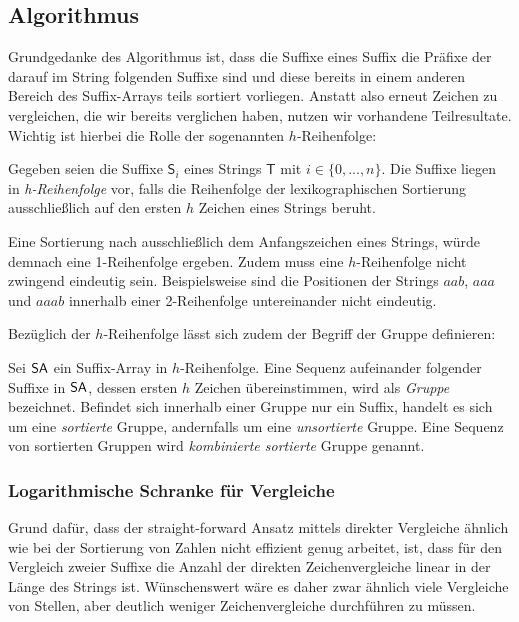 \subsection{Algorithmus}
\label{qsufsort:algo}
Grundgedanke des Algorithmus ist, dass die Suffixe eines Suffix die Präfixe der darauf im String folgenden Suffixe sind und diese bereits in einem anderen Bereich des Suffix-Arrays teils sortiert vorliegen. Anstatt also erneut Zeichen zu vergleichen, die wir bereits verglichen haben, nutzen wir vorhandene Teilresultate.
Wichtig ist hierbei die Rolle der sogenannten $h$-Reihenfolge:
\begin{definition}[$h$-Reihenfolge]
Gegeben seien die Suffixe $\mathsf{S}_i$ eines Strings $\mathsf{T}$ mit $i \in \{0,...,n\}$. Die Suffixe liegen in \textit{h-Reihenfolge} vor, falls die Reihenfolge der lexikographischen Sortierung ausschließlich auf den ersten $h$ Zeichen eines Strings beruht. 
\end{definition}
Eine Sortierung nach ausschließlich dem Anfangszeichen eines Strings, würde demnach eine 1-Reihenfolge ergeben. Zudem muss eine $h$-Reihenfolge nicht zwingend eindeutig sein. Beispielsweise sind die Positionen der Strings $aab$, $aaa$ und $aaab$ innerhalb einer 2-Reihenfolge untereinander nicht eindeutig. 

Bezüglich der $h$-Reihenfolge lässt sich zudem der Begriff der Gruppe definieren:
\begin{definition}[Gruppe]
Sei $\sa$ ein Suffix-Array in $h$-Reihenfolge. Eine Sequenz aufeinander folgender Suffixe in $\sa$, dessen ersten $h$ Zeichen übereinstimmen, wird als \textit{Gruppe} bezeichnet. Befindet sich innerhalb einer Gruppe nur ein Suffix, handelt es sich um eine \textit{sortierte} Gruppe, andernfalls um eine \textit{unsortierte} Gruppe. 
Eine Sequenz von sortierten Gruppen wird \textit{kombinierte sortierte} Gruppe genannt.
\end{definition}

\subsubsection{Logarithmische Schranke für Vergleiche}
Grund dafür, dass der straight-forward Ansatz mittels direkter Vergleiche ähnlich wie bei der Sortierung von Zahlen nicht effizient genug arbeitet, ist, dass für den Vergleich zweier Suffixe die Anzahl der direkten Zeichenvergleiche linear in der Länge des Strings ist. Wünschenswert wäre es daher zwar ähnlich viele Vergleiche von Stellen, aber deutlich weniger Zeichenvergleiche durchführen zu müssen.

